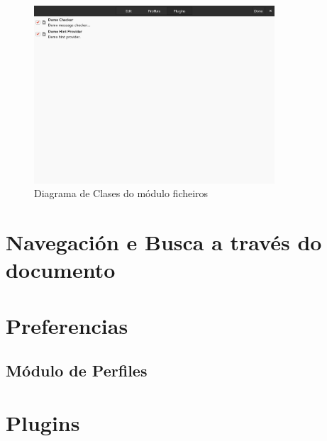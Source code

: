 \begin{figure}[h!]
    \centering
    \includegraphics[width=0.8\textwidth]{img/panel_preferencias_plugins.png}
    \caption{Diagrama de Clases do módulo ficheiros}
    \label{fig:dia_class:files}
\end{figure}


\section{Navegación e Busca a través do documento}

\section{Preferencias}

\subsection{Módulo de Perfiles}

\section{Plugins}
